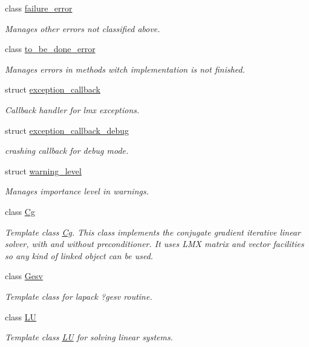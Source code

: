 \begin{DoxyCompactItemize}
class \hyperlink{classlmx_1_1failure__error}{failure\-\_\-error}
\begin{DoxyCompactList}\small\item\em Manages other errors not classified above. \end{DoxyCompactList}\item 
class \hyperlink{classlmx_1_1to__be__done__error}{to\-\_\-be\-\_\-done\-\_\-error}
\begin{DoxyCompactList}\small\item\em Manages errors in methods witch implementation is not finished. \end{DoxyCompactList}\item 
struct \hyperlink{structlmx_1_1exception__callback}{exception\-\_\-callback}
\begin{DoxyCompactList}\small\item\em Callback handler for lmx exceptions. \end{DoxyCompactList}\item 
struct \hyperlink{structlmx_1_1exception__callback__debug}{exception\-\_\-callback\-\_\-debug}
\begin{DoxyCompactList}\small\item\em crashing callback for debug mode. \end{DoxyCompactList}\item 
struct \hyperlink{structlmx_1_1warning__level}{warning\-\_\-level}
\begin{DoxyCompactList}\small\item\em Manages importance level in warnings. \end{DoxyCompactList}\item 
class \hyperlink{classlmx_1_1Cg}{Cg}
\begin{DoxyCompactList}\small\item\em Template class \hyperlink{classlmx_1_1Cg}{Cg}. This class implements the conjugate gradient iterative linear solver, with and without preconditioner. It uses L\-M\-X matrix and vector facilities so any kind of linked object can be used. \end{DoxyCompactList}\item 
class \hyperlink{classlmx_1_1Gesv}{Gesv}
\begin{DoxyCompactList}\small\item\em Template class for lapack ?gesv routine. \end{DoxyCompactList}\item 
class \hyperlink{classlmx_1_1LU}{L\-U}
\begin{DoxyCompactList}\small\item\em Template class \hyperlink{classlmx_1_1LU}{L\-U} for solving linear systems. \end{DoxyCompactList}\item 

\end{DoxyCompactItemize}
